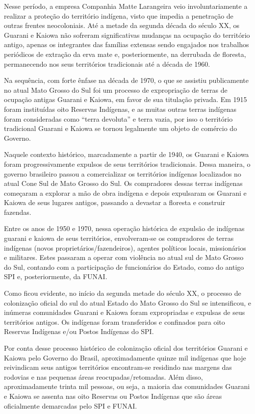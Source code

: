Nesse período, a empresa Companhia Matte Larangeira veio
involuntariamente a realizar a proteção do território indígena, visto
que impedia a penetração de outras frentes neocoloniais. Até a metade
da segunda década do século XX, os Guarani e Kaiowa não sofreram
significativas mudanças na ocupação do território antigo, apenas os
integrantes das famílias extensas sendo engajados nos trabalhos
periódicos de extração da erva mate e, posteriormente, na derrubada de
floresta, permanecendo nos seus territórios tradicionais até a década
de 1960.

Na sequência, com forte ênfase na década de 1970, o que se assistiu
publicamente no atual Mato Grosso do Sul foi um processo de
expropriação de terras de ocupação antigas Guarani e Kaiowa, em favor
de sua titulação privada. Em 1915 foram instituídas oito Reservas
Indígenas, e as muitas outras terras indígenas foram consideradas como
``terra devoluta'' e terra vazia, por isso o território tradicional
Guarani e Kaiowa se tornou legalmente um objeto de comércio do Governo.


Naquele contexto histórico, marcadamente a partir de 1940, os Guarani e
Kaiowa foram progressivamente expulsos de seus territórios
tradicionais. Dessa maneira, o governo brasileiro passou a
comercializar os territórios indígenas localizados no atual Cone Sul de
Mato Grosso do Sul. Os compradores dessas terras indígenas começaram a
explorar a mão de obra indígena e depois expulsaram os Guarani e Kaiowa
de seus lugares antigos, passando a devastar a floresta e construir
fazendas.

Entre os anos de 1950 e 1970, nessa operação histórica de expulsão de
indígenas guarani e kaiowa de seus territórios, envolveram-se os
compradores de terras indígenas (novos proprietários/fazendeiros),
agentes políticos locais, missionários e militares. Estes passaram a
operar com violência no atual sul de Mato Grosso do Sul, contando com a
participação de funcionários do Estado, como do antigo SPI e,
posteriormente, da FUNAI. 

Como ficou evidente, no início da segunda metade do século XX, o
processo de colonização oficial do sul do atual Estado do Mato Grosso
do Sul se intensificou, e inúmeras comunidades Guarani e Kaiowa foram
expropriadas e expulsas de seus territórios antigos. Os indígenas foram
transferidos e confinados para oito Reservas Indígenas e/ou Postos
Indígenas do SPI. 

Por conta desse processo histórico de colonização oficial dos
territórios Guarani e Kaiowa pelo Governo do Brasil, aproximadamente
quinze mil indígenas que hoje reivindicam seus antigos territórios
encontram-se residindo nas margens das rodovias e nas pequenas áreas
reocupadas/retomadas. Além disso, aproximadamente trinta mil pessoas,
ou seja, a maioria das comunidades Guarani e Kaiowa se assenta nas oito
Reservas ou Postos Indígenas que são áreas oficialmente demarcadas pelo
SPI e FUNAI. 

